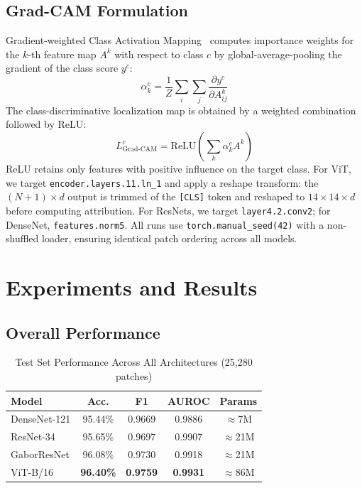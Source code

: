 \documentclass[conference]{IEEEtran}
\begin{document}
\subsection{Grad-CAM Formulation}
Gradient-weighted Class Activation Mapping~\cite{b9} computes importance weights for the $k$-th feature map $A^k$ with respect to class $c$ by global-average-pooling the gradient of the class score $y^c$:
\begin{equation}
\alpha^c_k = \frac{1}{Z}\sum_i\sum_j \frac{\partial y^c}{\partial A^k_{ij}}
\end{equation}
The class-discriminative localization map is obtained by a weighted combination followed by ReLU:
\begin{equation}
L^c_\text{Grad-CAM} = \text{ReLU}\!\left(\sum_k \alpha^c_k A^k\right)
\end{equation}
ReLU retains only features with positive influence on the target class. For ViT, we target \texttt{encoder.layers.11.ln\_1} and apply a reshape transform: the $(N+1) \times d$ output is trimmed of the \texttt{[CLS]} token and reshaped to $14\times14\times d$ before computing attribution. For ResNets, we target \texttt{layer4.2.conv2}; for DenseNet, \texttt{features.norm5}. All runs use \texttt{torch.manual\_seed(42)} with a non-shuffled loader, ensuring identical patch ordering across all models.

\section{Experiments and Results}

\subsection{Overall Performance}

\begin{table}[htbp]
\caption{Test Set Performance Across All Architectures (25,280 patches)}
\begin{center}
\begin{tabular}{lcccc}
\toprule
\textbf{Model} & \textbf{Acc.} & \textbf{F1} & \textbf{AUROC} & \textbf{Params} \\
\midrule
DenseNet-121   & 95.44\%          & 0.9669        & 0.9886         & $\approx$7M  \\
ResNet-34      & 95.65\%          & 0.9697        & 0.9907         & $\approx$21M \\
GaborResNet    & 96.08\%          & 0.9730        & 0.9918         & $\approx$21M \\
ViT-B/16       & \textbf{96.40\%} & \textbf{0.9759} & \textbf{0.9931} & $\approx$86M \\
\bottomrule
\end{tabular}
\label{tab1}
\end{center}
\end{table}
\end{document}
